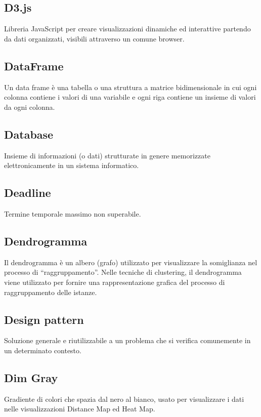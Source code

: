 \documentclass[../glossario.tex]{subfiles}
\begin{document}
    
\subsection*{D3.js}
{}
Libreria JavaScript per creare visualizzazioni dinamiche ed interattive partendo da dati organizzati, visibili attraverso un comune browser.


\subsection*{DataFrame}
Un data frame è una tabella o una struttura a matrice bidimensionale in cui ogni colonna contiene i valori di una variabile e ogni riga contiene un insieme di valori da ogni colonna.


\subsection*{Database}
Insieme di informazioni (o dati) strutturate in genere memorizzate elettronicamente in un sistema informatico.

\subsection*{Deadline}
Termine temporale massimo non superabile.

\subsection*{Dendrogramma}
Il dendrogramma è un albero (grafo) utilizzato per visualizzare la somiglianza nel processo di “raggruppamento”. Nelle tecniche di clustering, il dendrogramma viene utilizzato per fornire una rappresentazione grafica del processo di raggruppamento delle istanze.

\subsection*{Design pattern}
Soluzione generale e riutilizzabile a un problema che si verifica comunemente in un determinato contesto.

\subsection*{Dim Gray}
Gradiente di colori che spazia dal nero al bianco, usato per visualizzare i dati nelle visualizzazioni Distance Map ed Heat Map.
\end{document}
